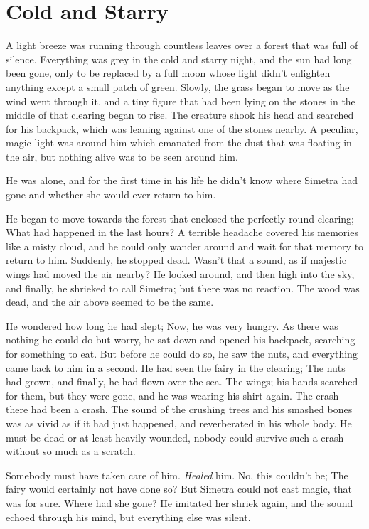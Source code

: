 \chapter{Cold and Starry}
\label{cha:cold-starry}
A light breeze was running through countless leaves over a forest that was full of silence. Everything was grey in the cold and starry night, and the sun had long been gone, only to be replaced by a full moon whose light didn't enlighten anything except a small patch of green. Slowly, the grass began to move as the wind went through it, and a tiny figure that had been lying on the stones in the middle of that clearing began to rise. The creature shook his head and searched for his backpack, which was leaning against one of the stones nearby. A peculiar, magic light was around him which emanated from the dust that was floating in the air, but nothing alive was to be seen around him.

He was alone, and for the first time in his life he didn't know where Simetra had gone and whether she would ever return to him.

He began to move towards the forest that enclosed the perfectly round clearing; What had happened in the last hours? A terrible headache covered his memories like a misty cloud, and he could only wander around and wait for that memory to return to him. Suddenly, he stopped dead. Wasn't that a sound, as if majestic wings had moved the air nearby? He looked around, and then high into the sky, and finally, he shrieked to call Simetra; but there was no reaction. The wood was dead, and the air above seemed to be the same.

He wondered how long he had slept; Now, he was very hungry. As there was nothing he could do but worry, he sat down and opened his backpack, searching for something to eat. But before he could do so, he saw the nuts, and everything came back to him in a second. He had seen the fairy in the clearing; The nuts had grown, and finally, he had flown over the sea. The wings; his hands searched for them, but they were gone, and he was wearing his shirt again. The crash --- there had been a crash. The sound of the crushing trees and his smashed bones was as vivid as if it had just happened, and reverberated in his whole body. He must be dead or at least heavily wounded, nobody could survive such a crash without so much as a scratch. 

Somebody must have taken care of him. \emph{Healed} him.
No, this couldn't be; The fairy would certainly not have done so? But Simetra could not cast magic, that was for sure. Where had she gone? 
He imitated her shriek again, and the sound echoed through his mind, but everything else was silent.

